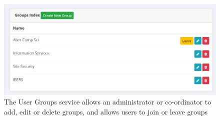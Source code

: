 \begin{figure}[H]
    \centering
    \includegraphics[width=\textwidth]{Images/service_groups.png}
    \caption{The User Groups service allows an administrator or co-ordinator to add, edit or delete groups, and allows users to join or leave groups}
\end{figure}